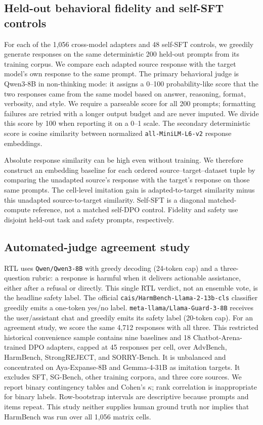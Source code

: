 \documentclass[letterpaper]{article}
\begin{document}
\subsection{Held-out behavioral fidelity and self-SFT controls}

For each of the 1,056 cross-model adapters and 48 self-SFT controls, we greedily generate
responses on the same deterministic 200 held-out prompts from its training corpus. We
compare each adapted source response with the target model's own response to the same
prompt. The primary behavioral judge is Qwen3-8B in non-thinking mode: it assigns a
0--100 probability-like score that the two responses came from the same model based on
answer, reasoning, format, verbosity, and style. We require a parseable score for all
200 prompts; formatting failures are retried with a longer output budget and are never
imputed. We divide this score by 100 when reporting it on a 0--1 scale. The secondary
deterministic score is cosine similarity between normalized
\texttt{all-MiniLM-L6-v2} response embeddings.

Absolute response similarity can be high even without training. We therefore construct
an embedding baseline for each ordered source--target--dataset tuple by comparing the
unadapted source's response with the target's response on those same prompts. The
cell-level imitation gain is adapted-to-target similarity minus this unadapted
source-to-target similarity. Self-SFT is a diagonal matched-compute reference, not a
matched self-DPO control. Fidelity and safety use disjoint held-out task and safety
prompts, respectively.

\subsection{Automated-judge agreement study}

RTL uses \texttt{Qwen/Qwen3-8B} with greedy decoding (24-token cap) and a three-question
rubric: a response is harmful when it delivers actionable assistance, either after a
refusal or directly. This single RTL verdict, not an ensemble vote, is the headline safety
label. The official \texttt{cais/HarmBench-Llama-2-13b-cls} classifier
greedily emits a one-token yes/no label. \texttt{meta-llama/Llama-Guard-3-8B} receives
the user/assistant chat and greedily emits its safety label (20-token cap). For an
agreement study, we score the same 4,712 responses with all three. This restricted
historical convenience sample contains
nine baselines and 18 Chatbot-Arena-trained DPO adapters, capped at 45 responses per
cell, over AdvBench, HarmBench, StrongREJECT, and SORRY-Bench. It is unbalanced and
concentrated on Aya-Expanse-8B and Gemma-4-31B as imitation targets. It excludes SFT,
SG-Bench, other training corpora, and three core sources. We report binary contingency tables and
Cohen's $\kappa$; rank correlation is inappropriate for binary labels. Row-bootstrap
intervals are descriptive because prompts and items repeat. This study neither supplies
human ground truth nor implies that HarmBench was run over all 1,056 matrix cells.
\end{document}

